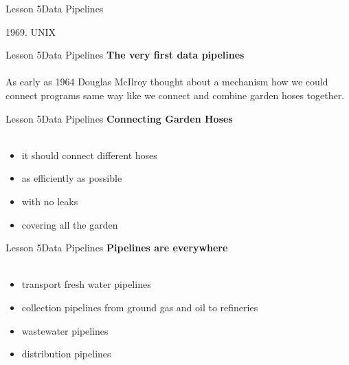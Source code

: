 \documentclass[aspectratio=1610]{beamer}
\begin{document}
\begin{frame}{Lesson 5}{Data Pipelines}
\Huge
\begin{center}
1969. UNIX 
\end{center}
\end{frame}

\begin{frame}{Lesson 5}{Data Pipelines}
\LARGE
\textbf{The very first data pipelines}\\~\\
As early as 1964 Douglas McIlroy thought about a mechanism how we 
could connect programs same way like we connect and combine
garden hoses together. 
\end{frame}


\begin{frame}
\end{frame}


\begin{frame}
\end{frame}


\begin{frame}
\end{frame}

\begin{frame}{Lesson 5}{Data Pipelines}
\LARGE
\textbf{Connecting Garden Hoses}\\~\\
\begin{itemize}
    \item it should connect different hoses
    \item as efficiently as possible
    \item with no leaks
    \item covering all the garden
\end{itemize}
\end{frame}



\begin{frame}{Lesson 5}{Data Pipelines}
\LARGE
\textbf{Pipelines are everywhere}\\~\\
\begin{itemize}
    \item transport fresh water pipelines
    \item collection pipelines from ground gas and oil to refineries
    \item wastewater pipelines
    \item distribution pipelines
\end{itemize}
\end{frame}
\end{document}
